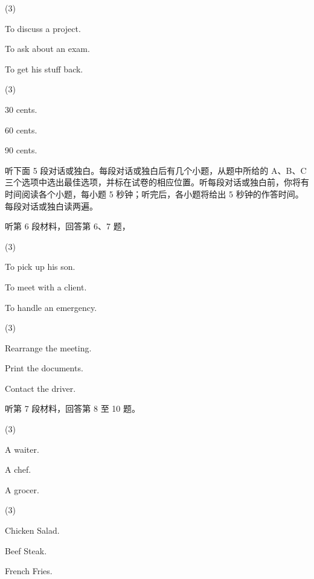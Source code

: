 \documentclass{英语试卷}
\begin{document}
\begin{choices}(3)
  \item To discuss a project.
  \item To ask about an exam.
  \item To get his stuff back.
\end{choices}
\begin{choices}(3)
  \item 30 cents.
  \item 60 cents.
  \item 90 cents.
\end{choices}
\par 听下面 5 段对话或独白。每段对话或独白后有几个小题，从题中所给的 A、B、C 三个选项中选出最佳选项，并标在试卷的相应位置。听每段对话或独白前，你将有时间阅读各个小题，每小题 5 秒钟；听完后，各小题将给出 5 秒钟的作答时间。每段对话或独白读两遍。\par
\par 听第 6 段材料，回答第 6、7 题，\par
{}
\begin{choices}(3)
  \item To pick up his son.
  \item To meet with a client.
  \item To handle an emergency.
\end{choices}
\begin{choices}(3)
  \item Rearrange the meeting.
  \item Print the documents.
  \item Contact the driver.
\end{choices}
\par 听第 7 段材料，回答第 8 至 10 题。\par
{}
\begin{choices}(3)
  \item A waiter.
  \item A chef.
  \item A grocer.
\end{choices}
\begin{choices}(3)
  \item Chicken Salad.
  \item Beef Steak.
  \item French Fries.
\end{choices}
\end{document}
